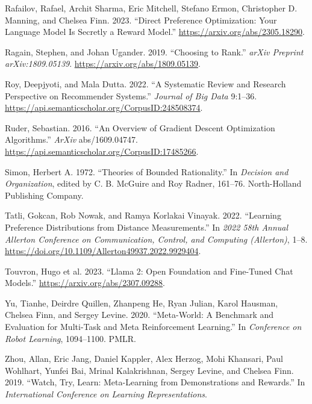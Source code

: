 \documentclass[
  letterpaper,
  numbers=noenddot,
  DIV=11]{scrreprt}
\newlength{\cslhangindent}
\newenvironment{CSLReferences}[2] %
 {\begin{list}{}{%
  \setlength{\itemindent}{0pt}
  \setlength{\leftmargin}{0pt}
  \setlength{\parsep}{0pt}
  \ifodd #1
   \setlength{\leftmargin}{\cslhangindent}
   \setlength{\itemindent}{-1\cslhangindent}
  \fi
  \setlength{\itemsep}{#2\baselineskip}}}
 {\end{list}}
\theoremstyle{definition}
\theoremstyle{plain}
\theoremstyle{plain}
\theoremstyle{remark}
\begin{document}
\begin{CSLReferences}{1}{0}
Rafailov, Rafael, Archit Sharma, Eric Mitchell, Stefano Ermon,
Christopher D. Manning, and Chelsea Finn. 2023. {``Direct Preference
Optimization: Your Language Model Is Secretly a Reward Model.''}
\url{https://arxiv.org/abs/2305.18290}.

Ragain, Stephen, and Johan Ugander. 2019. {``Choosing to Rank.''}
\emph{arXiv Preprint arXiv:1809.05139}.
\url{https://arxiv.org/abs/1809.05139}.

Roy, Deepjyoti, and Mala Dutta. 2022. {``A Systematic Review and
Research Perspective on Recommender Systems.''} \emph{Journal of Big
Data} 9:1--36. \url{https://api.semanticscholar.org/CorpusID:248508374}.

Ruder, Sebastian. 2016. {``An Overview of Gradient Descent Optimization
Algorithms.''} \emph{ArXiv} abs/1609.04747.
\url{https://api.semanticscholar.org/CorpusID:17485266}.

Simon, Herbert A. 1972. {``Theories of Bounded Rationality.''} In
\emph{Decision and Organization}, edited by C. B. McGuire and Roy
Radner, 161--76. North-Holland Publishing Company.

Tatli, Gokcan, Rob Nowak, and Ramya Korlakai Vinayak. 2022. {``Learning
Preference Distributions from Distance Measurements.''} In \emph{2022
58th Annual Allerton Conference on Communication, Control, and Computing
(Allerton)}, 1--8.
\url{https://doi.org/10.1109/Allerton49937.2022.9929404}.

Touvron, Hugo et al. 2023. {``Llama 2: Open Foundation and Fine-Tuned
Chat Models.''} \url{https://arxiv.org/abs/2307.09288}.

Yu, Tianhe, Deirdre Quillen, Zhanpeng He, Ryan Julian, Karol Hausman,
Chelsea Finn, and Sergey Levine. 2020. {``Meta-World: A Benchmark and
Evaluation for Multi-Task and Meta Reinforcement Learning.''} In
\emph{Conference on Robot Learning}, 1094--1100. PMLR.

Zhou, Allan, Eric Jang, Daniel Kappler, Alex Herzog, Mohi Khansari, Paul
Wohlhart, Yunfei Bai, Mrinal Kalakrishnan, Sergey Levine, and Chelsea
Finn. 2019. {``Watch, Try, Learn: Meta-Learning from Demonstrations and
Rewards.''} In \emph{International Conference on Learning
Representations}.

\end{CSLReferences}
\end{document}
